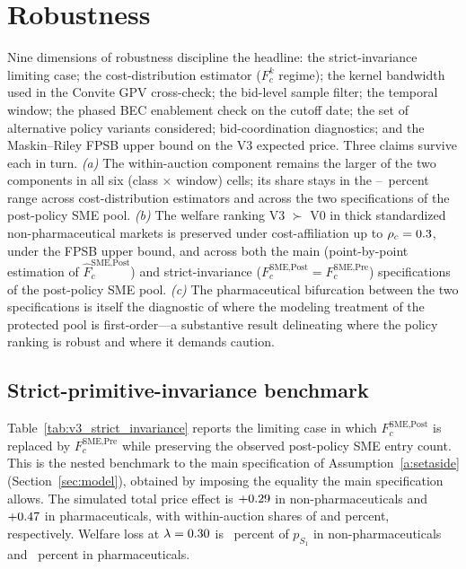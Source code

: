 \section{Robustness}\label{sec:robustness}

Nine dimensions of robustness discipline the headline: the strict-invariance limiting case; the cost-distribution estimator ($F_c^k$ regime); the kernel bandwidth used in the Convite GPV cross-check; the bid-level sample filter; the temporal window; the phased BEC enablement check on the cutoff date; the set of alternative policy variants considered; bid-coordination diagnostics; and the Maskin--Riley FPSB upper bound on the V3 expected price. Three claims survive each in turn. \emph{(a)} The within-auction component remains the larger of the two components in all six (class $\times$ window) cells; its share stays in the \withinShareLow--\withinShareHigh~percent range across cost-distribution estimators and across the two specifications of the post-policy SME pool. \emph{(b)} The welfare ranking V3 $\succ$ V0 in thick standardized non-pharmaceutical markets is preserved under cost-affiliation up to $\rho_c = 0.3$, under the FPSB upper bound, and across both the main (point-by-point estimation of $\hat F_c^{\text{SME,Post}}$) and strict-invariance ($F_c^{\text{SME,Post}} = F_c^{\text{SME,Pre}}$) specifications of the post-policy SME pool. \emph{(c)} The pharmaceutical bifurcation between the two specifications is itself the diagnostic of where the modeling treatment of the protected pool is first-order---a substantive result delineating where the policy ranking is robust and where it demands caution.

\subsection{Strict-primitive-invariance benchmark}

Table~\ref{tab:v3_strict_invariance} reports the limiting case in which $F_c^{\text{SME,Post}}$ is replaced by $F_c^{\text{SME,Pre}}$ while preserving the observed post-policy SME entry count. This is the nested benchmark to the main specification of Assumption~\ref{a:setaside} (Section~\ref{sec:model}), obtained by imposing the equality the main specification allows. The simulated total price effect is $+0.29$ in non-pharmaceuticals and $+0.47$ in pharmaceuticals, with within-auction shares of \strictShareNp{} and \strictSharePh{} percent, respectively. Welfare loss at $\lambda = 0.30$ is \siWelfLossPctNp~percent of $p_{S_1}$ in non-pharmaceuticals and \siWelfLossPctPh~percent in pharmaceuticals.

